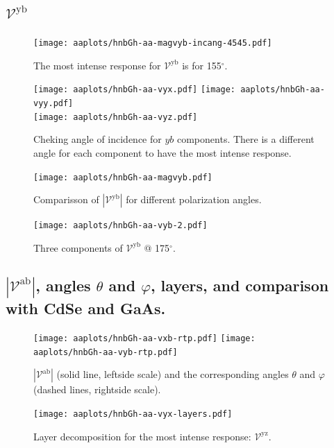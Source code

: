 \documentclass{article}
\let\Oldsubsection\subsection
\renewcommand{\subsection}{\FloatBarrier\Oldsubsection}
\begin{document}
\subsection{$\mathcal{V}^{\mathrm{yb}} $}
\begin{figure}[h!]
    \centering
    \texttt{[image: aaplots/hnbGh-aa-magvyb-incang-4545.pdf]}
    \caption{The most intense response for $\mathcal{V}^{\mathrm{yb}} $ is for 
    155$^{\circ}$.}
    \label{fig:aa-magvybincang}
\end{figure}
\begin{figure}[h!]
    \centering
    \texttt{[image: aaplots/hnbGh-aa-vyx.pdf]}
    \texttt{[image: aaplots/hnbGh-aa-vyy.pdf]}\\
    \texttt{[image: aaplots/hnbGh-aa-vyz.pdf]}
    \caption{Cheking angle of incidence for $yb$ components. There is a
    different angle for each component to have the most intense response.}
    \label{fig:aa-ybangcomp}
\end{figure}
\begin{figure}[ht!]
    \centering
    \texttt{[image: aaplots/hnbGh-aa-magvyb.pdf]}
    \caption{Comparisson of $|\mathcal{V}^{\mathrm{yb}}|$ for different
    polarization angles.}
    \label{fig:aa-magvyb}
\end{figure}
\begin{figure}[t!]
    \centering
    \texttt{[image: aaplots/hnbGh-aa-vyb-2.pdf]}
    \caption{Three components of $\mathcal{V}^{\mathrm{yb}} $ @ 175$^{\circ}$.}
    \label{fig:aa-vyb2}
\end{figure}

\clearpage

\subsection{$|\mathcal{V}^{\mathrm{ab}}|$, angles
$\theta$ and $\varphi$, layers, and comparison with CdSe and GaAs.}
\begin{figure}[ht]
    \centering
    \texttt{[image: aaplots/hnbGh-aa-vxb-rtp.pdf]}
    \texttt{[image: aaplots/hnbGh-aa-vyb-rtp.pdf]}
    \caption{$|\mathcal{V}^{\mathrm{ab}}|$ (solid line, leftside scale) and the
    corresponding angles $\theta$ and $\varphi$ (dashed lines, rightside scale).}
    \label{fig:aa-rtp}
\end{figure}

\begin{figure}[ht]
    \centering
    \texttt{[image: aaplots/hnbGh-aa-vyx-layers.pdf]}
    \caption{Layer decomposition for the most intense response:
    $\mathcal{V}^{\mathrm{yz}}$.}
    \label{fig:aa-lay}
\end{figure}
\end{document}

